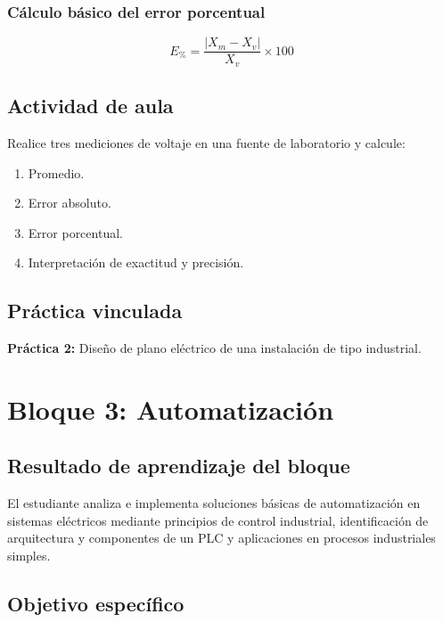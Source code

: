 \documentclass[
  spanish,
  letterpaper,
  DIV=11,
  numbers=noendperiod]{scrreprt}
\providecommand{\tightlist}{%
  \setlength{\itemsep}{0pt}\setlength{\parskip}{0pt}}
\begin{document}
\subsection{Cálculo básico del error
porcentual}\label{cuxe1lculo-buxe1sico-del-error-porcentual}

\[
E_{\%} = \frac{|X_m - X_v|}{X_v} \times 100
\]

\section{Actividad de aula}\label{actividad-de-aula}

Realice tres mediciones de voltaje en una fuente de laboratorio y
calcule:

\begin{enumerate}
\def\labelenumi{\arabic{enumi}.}
\tightlist
\item
  Promedio.
\item
  Error absoluto.
\item
  Error porcentual.
\item
  Interpretación de exactitud y precisión.
\end{enumerate}

\section{Práctica vinculada}\label{pruxe1ctica-vinculada}

\textbf{Práctica 2:} Diseño de plano eléctrico de una instalación de
tipo industrial.


\chapter{Bloque 3: Automatización}\label{bloque-3-automatizaciuxf3n}

\section{Resultado de aprendizaje del
bloque}\label{resultado-de-aprendizaje-del-bloque-2}

El estudiante analiza e implementa soluciones básicas de automatización
en sistemas eléctricos mediante principios de control industrial,
identificación de arquitectura y componentes de un PLC y aplicaciones en
procesos industriales simples.

\section{Objetivo específico}\label{objetivo-especuxedfico-1}
\end{document}
